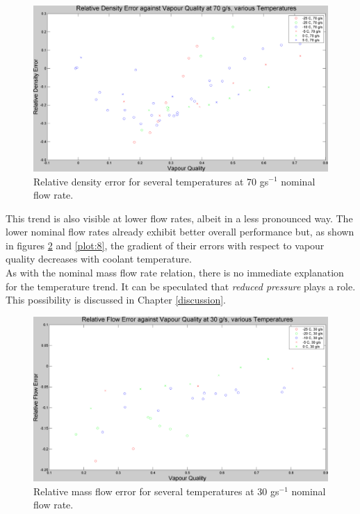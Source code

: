 \documentclass{report}
\begin{document}
\begin{figure}
\includegraphics[width=\textwidth]{plots/fig6}
\caption{Relative density error for several temperatures at 70 gs$^{-1}$ nominal flow rate.}
\label{plot:6}
\end{figure}
\FloatBarrier
This trend is also visible at lower flow rates, albeit in a less pronounced way. The lower nominal flow rates already exhibit better overall performance  but, as shown in figures \ref{plot:7} and \ref{plot:8}, the gradient of their errors with respect to vapour quality decreases with coolant temperature.\\
As with the nominal mass flow rate relation, there is no immediate explanation for the temperature trend. It can be speculated that \textit{reduced pressure} plays a role. This possibility is discussed in Chapter \ref{discussion}. \FloatBarrier
\begin{figure}[h]
\includegraphics[width=\textwidth]{plots/fig7}
\caption{Relative mass flow error for several temperatures at 30 gs$^{-1}$ nominal flow rate.}
\label{plot:7}
\end{figure}
\end{document}
